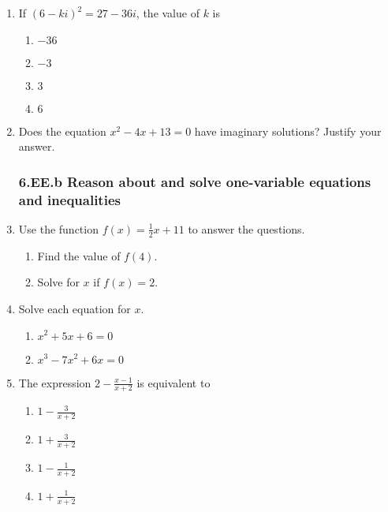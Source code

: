 \documentclass[12pt, twoside]{article}
\begin{document}
\begin{enumerate}[itemsep=0.5cm]
\newpage
\item If \((6 - ki)^2 = 27 - 36i\), the value of \(k\) is
\begin{enumerate}
    \item \(-36\)
    \item \(-3\)
    \item \(3\)
    \item \(6\)
\end{enumerate}

\item Does the equation $x^2 - 4x + 13 = 0$ have imaginary solutions? Justify your answer.

\subsubsection*{6.EE.b Reason about and solve one-variable equations and inequalities}

\item Use the function $f(x) = \frac{1}{2}x + 11$ to answer the questions.
    \begin{multicols}{2}
    \begin{enumerate}[itemsep=2cm]
        \item Find the value of $f(4)$.
        \item Solve for $x$ if $f(x) = 2$.
    \end{enumerate}
    \end{multicols} \vspace{2cm}

    
\item Solve each equation for $x$.
\begin{multicols}{2}
    \begin{enumerate}
    \item $x^2+5x+6 = 0$
    \item $x^3-7x^2+6x = 0$ 
    \end{enumerate} 
\end{multicols} \vspace{3cm}

\item The expression $\displaystyle 2 - \frac{x - 1}{x + 2}$ is equivalent to 
\begin{multicols}{2}
    \begin{enumerate}
    \item $\displaystyle 1 - \frac{3}{x + 2}$
    \item $\displaystyle 1 + \frac{3}{x + 2}$ 
    \item $\displaystyle 1 - \frac{1}{x + 2}$
    \item $\displaystyle 1 + \frac{1}{x + 2}$ 
    \end{enumerate} 
\end{multicols} 


\end{enumerate}
\end{document}
